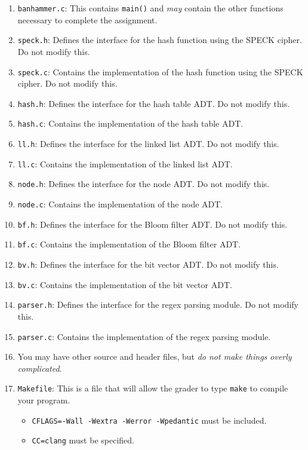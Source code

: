 \documentclass{article}
\begin{document}
\begin{enumerate}
  \item \texttt{banhammer.c}: This contains \texttt{main()} and
    \emph{may} contain the other functions necessary to complete the
    assignment.
  \item \texttt{speck.h}: Defines the interface for the hash function
    using the SPECK cipher. Do not modify this.
  \item \texttt{speck.c}: Contains the implementation of the hash
    function using the SPECK cipher. Do not modify this.
  \item \texttt{hash.h}: Defines the interface for the hash table ADT.
    Do not modify this.
  \item \texttt{hash.c}: Contains the implementation of the hash table
    ADT.
  \item \texttt{ll.h}: Defines the interface for the linked list ADT. Do
    not modify this.
  \item \texttt{ll.c}: Contains the implementation of the linked list
    ADT.
  \item \texttt{node.h}: Defines the interface for the node ADT. Do not
    modify this.
  \item \texttt{node.c}: Contains the implementation of the node ADT.
  \item \texttt{bf.h}: Defines the interface for the Bloom filter ADT.
    Do not modify this.
  \item \texttt{bf.c}: Contains the implementation of the Bloom filter ADT.
  \item \texttt{bv.h}: Defines the interface for the bit vector ADT. Do
    not modify this.
  \item \texttt{bv.c}: Contains the implementation of the bit vector
    ADT.
  \item \texttt{parser.h}: Defines the interface for the regex parsing
    module. Do not modify this.
  \item \texttt{parser.c}: Contains the implementation of the regex
    parsing module.
  \item You may have other source and header files, but \emph{do not
    make things overly complicated}.
  \item \texttt{Makefile}: This is a file that will allow the grader to
    type \texttt{make} to compile your program.
  \begin{itemize}
      \item \texttt{CFLAGS=-Wall -Wextra -Werror -Wpedantic}
        must be included.
      \item \texttt{CC=clang} must be specified.

\end{itemize}
\end{enumerate}
\end{document}
